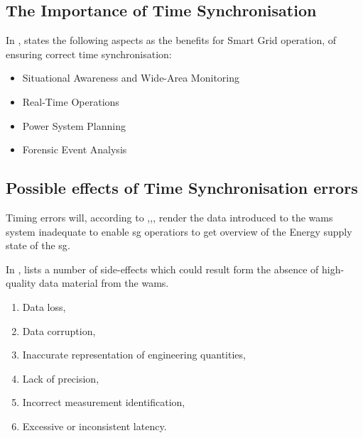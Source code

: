 %





\subsection{The Importance of Time Synchronisation}

In \cite{dagle2019importance}, \citeauthor{dagle2019importance} states the following aspects as the benefits for Smart Grid operation, of ensuring correct time synchronisation:


\begin{itemize}
    \item  Situational Awareness and Wide-Area Monitoring
    \item  Real-Time Operations
    \item  Power System Planning 
    \item  Forensic Event Analysis
    
\end{itemize}

\subsection{Possible effects of Time Synchronisation errors}
Timing errors will, according to ,,, render the data introduced to the \acrshort{wams} system inadequate to enable \acrshort{sg} operatiors to get overview of the Energy supply state of the \acrshort{sg}.

In \Cite{martin2019impact}, \citeauthor{martin2019impact} lists a number of side-effects which could result form the absence of high-quality data material from the \acrshort{wams}.


\begin{enumerate}




    \item Data loss,
    \item Data corruption,
    \item Inaccurate representation of engineering quantities,
    \item Lack of precision,
    \item Incorrect measurement identification,
    \item Excessive or inconsistent latency.

\end{enumerate}




